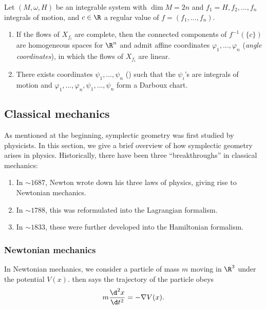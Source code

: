 \documentclass[a4paper]{article}
\begin{document}
\begin{thm}
  Let $(M, \omega, H)$ be an integrable system with $\dim M = 2n$ and $f_1 = H, f_2, \ldots, f_n$ integrals of motion, and $c \in \R$ a regular value of $f = (f_1, \ldots, f_n)$.

  \begin{enumerate}
    \item If the flows of $X_{f_i}$ are complete, then the connected components of $f^{-1}(\{c\})$ are homogeneous spaces for $\R^n$ and admit affine coordinates $\varphi_1, \ldots, \varphi_n$ (\emph{angle coordinates}), in which the flows of $X_{f_i}$ are linear.
    \item There exists coordinates $\psi_1, \ldots, \psi_n$ () such that the $\psi_i$'s are integrals of motion and $\varphi_1, \ldots, \varphi_n, \psi_1, \ldots, \psi_n$ form a Darboux chart.
  \end{enumerate}
\end{thm}


\subsection{Classical mechanics}
As mentioned at the beginning, symplectic geometry was first studied by physicists. In this section, we give a brief overview of how symplectic geometry arises in physics. Historically, there have been three ``breakthroughs'' in classical mechanics:
\begin{enumerate}
  \item In $\sim 1687$, Newton wrote down his three laws of physics, giving rise to Newtonian mechanics.
  \item In $\sim 1788$, this was reformulated into the Lagrangian formalism.
  \item In $\sim 1833$, these were further developed into the Hamiltonian formalism.
\end{enumerate}

\subsubsection*{Newtonian mechanics}
In Newtonian mechanics, we consider a particle of mass $m$ moving in $\R^3$ under the potential $V(x)$.  then says the trajectory of the particle obeys
\[
  m\frac{\d^2 x}{\d t^2} = - \nabla V(x).
\]
\end{document}

